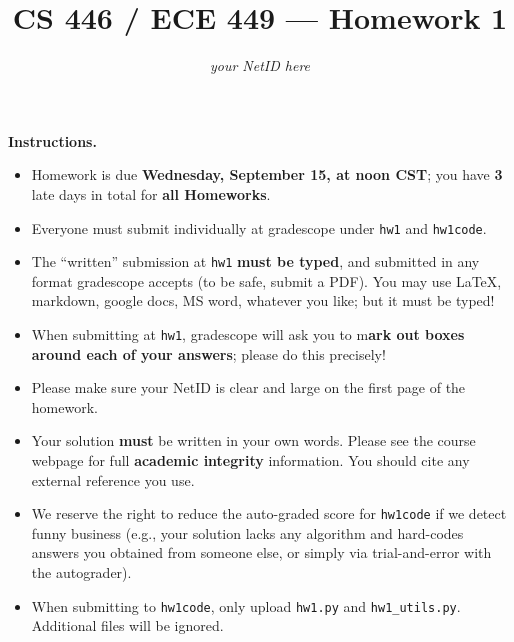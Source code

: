\documentclass{article}
\title{CS 446 / ECE 449 --- Homework 1}
\author{\emph{your NetID here}}
\theoremstyle{definition}
\theoremstyle{remark}
\begin{document}
        \maketitle

        \noindent\textbf{Instructions.}
        \begin{itemize}
          \item
            Homework is due \textbf{Wednesday, September 15, at noon CST}; you have \textbf{3} late days in total for \textbf{all Homeworks}.
        
          \item
            Everyone must submit individually at gradescope under \texttt{hw1} and \texttt{hw1code}.
        
          \item
            The ``written'' submission at \texttt{hw1} \textbf{must be typed}, and submitted in
            any format gradescope accepts (to be safe, submit a PDF).  You may use \LaTeX, markdown,
            google docs, MS word, whatever you like; but it must be typed!
        
          \item
            When submitting at \texttt{hw1}, gradescope will ask you to m\textbf{ark out boxes
            around each of your answers}; please do this precisely!
        
          \item
            Please make sure your NetID is clear and large on the first page of the homework.
        
          \item
            Your solution \textbf{must} be written in your own words.
            Please see the course webpage for full \textbf{academic integrity} information.
            You should cite any external reference you use.
        
          \item
            We reserve the right to reduce the auto-graded score for
            \texttt{hw1code} if we detect funny business (e.g., your solution
            lacks any algorithm and hard-codes answers you obtained from
            someone else, or simply via trial-and-error with the autograder).
            
          \item
           When submitting to \texttt{hw1code}, only upload \texttt{hw1.py} and \texttt{hw1\_utils.py}. Additional files will be ignored.
           
        \end{itemize}
        
\end{document}
